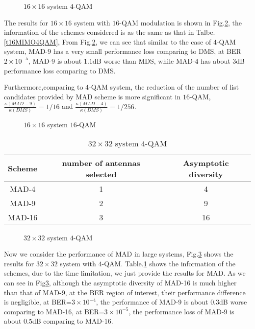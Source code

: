 \documentclass[12pt, draftclsnofoot, onecolumn]{IEEEtran}
\begin{document}
\begin{figure}[htb]
\centering
\def\svgwidth{\columnwidth}

\caption{$16\times 16$ system $4$-QAM}
\label{f16MIMO4QAM}
\end{figure}

The results for $16\times 16$ system with $16$-QAM modulation is shown in Fig.\ref{f16MIMO16QAM}, the information of the schemes considered is as the same as that in Talbe.\ref{t16MIMO4QAM}, From Fig.\ref{f16MIMO16QAM}, we can see that similar to the case of $4$-QAM system, MAD-9 has a very small performance loss comparing to DMS, at BER $2\times 10^{-5}$, MAD-9 is about $1.1$dB worse than MDS, while MAD-4 has about $3$dB  performance loss comparing to DMS.

Furthermore,comparing to $4$-QAM system, the reduction of the number of list candidates provided by MAD scheme is more significant in $16$-QAM, $\frac{\kappa(MAD-9)}{\kappa(DMS)}=1/16$ and $\frac{\kappa(MAD-4)}{\kappa(DMS)}=1/256$.
\begin{figure}[htb]
\centering
\def\svgwidth{\columnwidth}

\caption{$16\times 16$ system $16$-QAM}
\label{f16MIMO16QAM}
\end{figure}


\begin{table}[htb]
\renewcommand{\arraystretch}{1.3}
\caption{$32\times 32$ system $4$-QAM}
\label{t32MIMO4QAM}
\centering
\begin{tabular}{|c|c|c|}
\hline
Scheme&number of antennas selected&Asymptotic diversity\\
\hline 
MAD-4&1&4\\
\hline
MAD-9&2&9\\
\hline
MAD-16&3&16\\
\hline
\end{tabular}
\end{table}

\begin{figure}[htb]
\centering
\def\svgwidth{\columnwidth}

\caption{$32\times 32$ system $4$-QAM}
\label{f32MIMO4QAM}
\end{figure}
Now we consider the performance of MAD in large systems, Fig.\ref{f32MIMO4QAM} shows the results for $32\times 32$ system with $4$-QAM. Table.\ref{t32MIMO4QAM} shows the information of the schemes, due to the time limitation, we just provide the results for MAD. As we can see in Fig\ref{f32MIMO4QAM}, although the asymptotic diversity of MAD-16 is much higher than that of MAD-9, at the BER region of interest, their performance difference is negligible, at BER=$3\times 10^{-4}$, the performance of MAD-9 is about $0.3$dB worse comparing to MAD-16, at BER=$3\times 10^{-5}$, the performance loss of MAD-9 is about $0.5$dB comparing to MAD-16.
\end{document}
